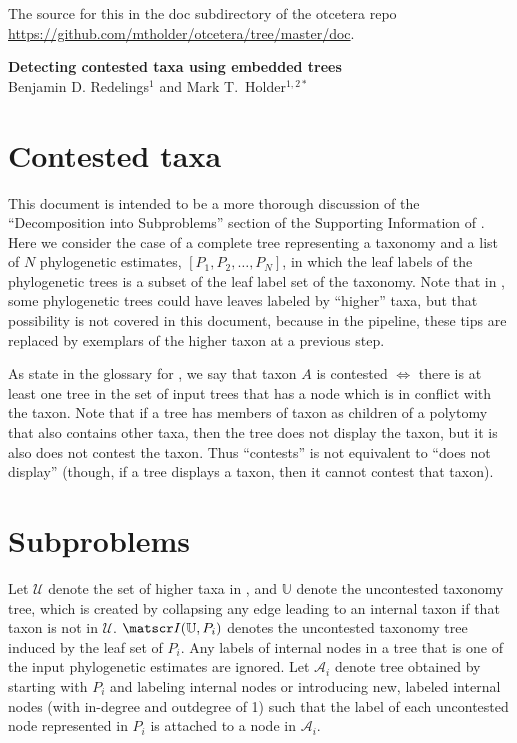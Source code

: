 \documentclass[11pt]{article}
\newcommand{\uncontestedTaxa}{\ensuremath{\mathcal{U}}\xspace}
\begin{document}
The source for this in the doc subdirectory of the otcetera
    repo \url{https://github.com/mtholder/otcetera/tree/master/doc}.
\begin{center}
    {\bf Detecting contested taxa using embedded trees} \\
{Benjamin D. Redelings$^{1}$ and Mark T.~Holder$^{1,2\ast}$}
\end{center}
\tableofcontents
\section{Contested taxa}
This document is intended to be a more thorough discussion of the
    ``Decomposition into Subproblems'' section of the Supporting
    Information of \citep{HinchliffEtAl2015}.
Here we consider the case of a complete tree representing a taxonomy \taxonomy and
    a list of $N$ phylogenetic estimates, $[P_1, P_2, \ldots, P_N]$, in which the leaf labels of the phylogenetic
    trees is a subset of the leaf label set of the taxonomy.
Note that in \citep{HinchliffEtAl2015}, some phylogenetic trees could have leaves labeled by
    ``higher'' taxa, but that possibility is not covered in this document, because in
    the \propinquity pipeline, these tips are replaced by exemplars of the higher taxon
    at a previous step.

As state in the glossary for \otc, we say that taxon $A$ is contested $\iff$ 
    there is at least one tree in the set of input trees that has a node which is in conflict
    with the taxon.
    Note that if a tree has members of taxon as children of a polytomy that also contains other taxa, then
        the tree does not display the taxon, but it is also does not contest the taxon.
    Thus ``contests'' is not equivalent to ``does not display'' (though, if a tree displays a taxon, then 
        it cannot contest that taxon).

\section{Subproblems}
Let $\uncontestedTaxa$ denote the set of higher taxa in \taxonomy,
    and $\mathbb{U}$ denote the uncontested taxonomy tree,
    which is created by collapsing any edge leading to
    an internal taxon if that taxon is not in $\uncontestedTaxa$.
$\induced{\mathbb{U}}{P_i}$ denotes the uncontested taxonomy tree induced by the leaf set
    of $P_i$.
Any labels of internal nodes in a tree that is one of the input phylogenetic estimates
    are ignored.
Let $\mathcal{A}_i$ denote tree obtained by starting with $P_i$ and labeling internal 
    nodes or introducing new, labeled internal nodes (with in-degree and outdegree of 1)
    such that the label of each uncontested node represented in $P_i$ is attached to a node
    in $\mathcal{A}_i$.


\end{document}
